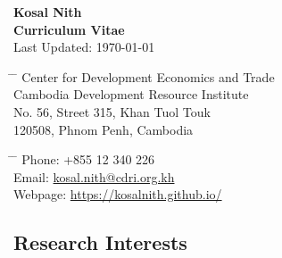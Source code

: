 \documentclass[10pt,a4paper]{article}
\begin{document}

\begin{center}
	\LARGE{\textbf{Kosal Nith}}\\
	\large{\textbf{Curriculum Vitae}\\
	\normalsize Last Updated:	\today}
\end{center}

\parbox{0.5\textwidth}{ %
	\begin{tabbing} %
		\hspace{3cm} \= \hspace{4cm} \= \kill %
		Center for Development Economics and Trade \\
		Cambodia Development Resource Institute\\ 
		No. 56, Street 315, Khan Tuol Touk \\
		120508, Phnom Penh, Cambodia
		
		
\end{tabbing}}
\hfill %
\parbox{0.5\textwidth}{ %
	\begin{tabbing} %
		\hspace{3cm} \= \hspace{4cm} \= \kill %
		Phone: +855 12 340 226 \\ 
		Email: \href{mailto:kosal.nith@cdri.org.kh}{kosal.nith@cdri.org.kh}\\
		Webpage: \href{https://kosalnith.github.io/}{https://kosalnith.github.io/}  
\end{tabbing}}
\vspace{-1em}

\subsection*{Research Interests}	
\end{document}
